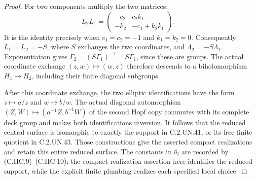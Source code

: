\begin{proof}
For two components multiply the two matrices:
\[
 L_2L_1=
 \begin{pmatrix}
   -c_2&c_2k_1\\
   -k_2&-c_1+k_2k_1
 \end{pmatrix}.
\tag{C.HC.11}
\]
It is the identity precisely when
$c_1=c_2=-1$ and $k_1=k_2=0$.
Consequently $L_1=L_2=-S$, where $S$ exchanges
the two coordinates, and
$\Lambda_2=-S\Lambda_1$.
Exponentiation gives
$\Gamma_2=(S\Gamma_1)^{-1}=S\Gamma_1$,
since these are groups. The actual coordinate
exchange $(z,w)\mapsto(w,z)$ therefore descends
to a biholomorphism $H_1\to H_2$, including
their finite diagonal subgroups.

After this coordinate exchange, the two
elliptic identifications have the form
$z\mapsto a/z$ and $w\mapsto b/w$.
The actual diagonal automorphism
$(Z,W)\mapsto(a^{-1}Z,b^{-1}W)$ of the second
Hopf copy commutes with its complete deck group
and makes both identifications inversion.
It follows that the reduced central surface
is isomorphic to exactly the support in
C.2.UN.41, or its free finite quotient in
C.2.UN.43. Those constructions give the asserted
compact realizations and retain this entire
reduced surface. The constants in $\theta_i$
are recorded by (C.HC.9)--(C.HC.10); the
compact realization assertion here identifies
the reduced support, while the explicit finite
plumbing realizes each specified local choice.
\end{proof}


